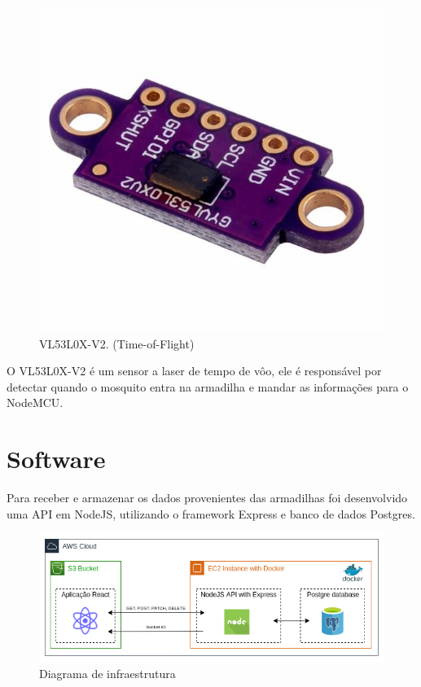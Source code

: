 \documentclass[
	12pt,				%
	openright,			%
	oneside,			%
	a4paper,			%
	chapter=TITLE,		%
	english,			%
	brazil				%
	]{abntex2}
\begin{document}
\begin{figure}[H]
\centering
\includegraphics[scale=0.1]{imagens/gy-vl53l0x.jpg}
\caption{VL53L0X-V2. (Time-of-Flight)}
    \label{fig:gy-vl53l0x}
\end{figure}

O VL53L0X-V2 é um sensor a laser de tempo de vôo, ele é responsável por detectar quando o mosquito entra na armadilha e mandar as 
informações para o NodeMCU.

\section{Software}

Para receber e armazenar os dados provenientes das armadilhas foi desenvolvido uma API em NodeJS, utilizando o framework Express
e banco de dados Postgres.

\begin{figure}[H]
\centering
\includegraphics[scale=0.6]{imagens/diagramacloud.png}
\caption{Diagrama de infraestrutura}
    \label{fig:cloud}
\end{figure}
\end{document}
